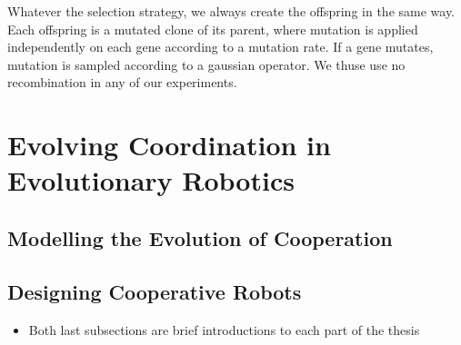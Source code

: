 
    Whatever the selection strategy, we always create the offspring in the same way. Each offspring is a mutated clone of its parent, where mutation is applied independently on each gene according to a mutation rate. If a gene mutates, mutation is sampled according to a gaussian operator. We thuse use no recombination in any of our experiments.


\section{Evolving Coordination in Evolutionary Robotics}
  
  \subsection{Modelling the Evolution of Cooperation}

  \subsection{Designing Cooperative Robots}
    \begin{itemize}
      \item{Both last subsections are brief introductions to each part of the thesis}
    \end{itemize}
